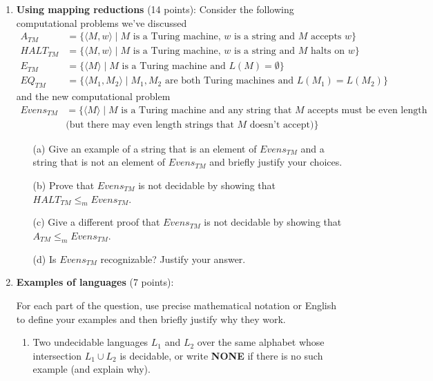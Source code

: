 \begin{enumerate}[wide, labelwidth=!, labelindent=0pt]
\item\textbf{Using mapping reductions} (14 points):
Consider the following computational problems we've discussed
\begin{align*}
A_{TM} &= \{ \langle M, w \rangle \mid M \text{ is a Turing machine, } w \text{ is a string and $M$ accepts $w$}\} \\
HALT_{TM} &= \{ \langle M, w \rangle \mid M \text{ is a Turing machine, } w \text{ is a string and $M$ halts on $w$}\} \\
E_{TM} &=  \{ \langle M \rangle \mid M \text{ is a Turing machine and } L(M) = \emptyset\} \\
EQ_{TM} &= \{ \langle M_1, M_2 \rangle \mid M_1, M_2 \text{ are both Turing machines and } L(M_1) = L(M_2) \}
\end{align*}
and the new computational problem
\begin{align*}
    Evens_{TM} &= \{ \langle M \rangle \mid M \text{ is a Turing machine 
    and any string that $M$ accepts must be even length}\\
    &\text{(but there may even length strings that $M$ doesn't accept)} \}
\end{align*}
\begin{enumerate}
\item[(a)] \gradeCorrect Give an example of a string that is an element of $Evens_{TM}$ and a string that is not an element of
$Evens_{TM}$ and briefly justify your choices.
\item[(b)] \gradeComplete Prove that $Evens_{TM}$ is not decidable by showing that $HALT_{TM} \leq_m Evens_{TM}$.
\item[(c)] \gradeCorrect Give a different proof that $Evens_{TM}$ is not decidable by showing that $A_{TM} \leq_m Evens_{TM}$.
\item[(d)] \gradeComplete Is $Evens_{TM}$ recognizable? Justify your answer.
\end{enumerate}


\item \textbf{Examples of languages} (7 points):

For each part of the question, use precise mathematical notation or English to define your examples
and then briefly justify why they work.

\begin{enumerate}
    \item\gradeCorrect Two undecidable languages $L_1$ and $L_2$ over the same alphabet
        whose intersection $L_1 \cup L_2$ is decidable, or write {\bf NONE}
        if there is no such example (and explain why).
    

\end{enumerate}
\end{enumerate}
